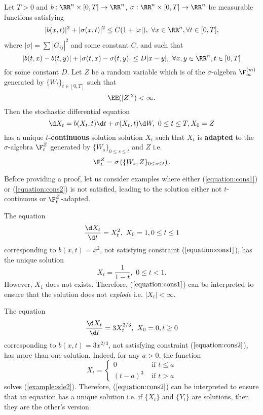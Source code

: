 Let $T>0$ and $b:\RR^n\times[0,T]\to\RR^n$, $\sigma:\RR^n\times[0,T]\to\RR^n$ be measurable functions satisfying
\begin{equation}
    \label{equation:cons1}
    |b(x,t)|^2+|\sigma(x,t)|^2\le C(1+|x|), \,\,\forall x\in\RR^n, \forall t\in[0,T],
\end{equation}
where $|\sigma|=\sum|G_{ij}|^2$ and some constant $C$, and such that
\begin{equation}
    \label{equation:cons2}
    |b(t,x)-b(t,y)|+|\sigma(t,x)-\sigma(t,y)|\le D|x-y|,\,\,\forall x,y\in\RR^n,t\in[0,T]
\end{equation}
for some constant $D$. Let $Z$ be a random variable which is  of the $\sigma$-algebra $\F_\infty^{(m)}$ generated by $\{W_t\}_{t\in[0,T]}$ such that $$\EE(|Z|^2)<\infty.$$
Then the stochastic differential equation
\begin{equation}
    \label{equation:sde:unique}
    \d X_t=b(X_t,t)\d t+\sigma(X_t,t)\d W,\,\, 0\le t\le T, X_0=Z
\end{equation}
has a unique $t$\textbf{-continuous} solution solution $X_t$ such that $X_t$ is \textbf{adapted} to the $\sigma$-algebra $\F_t^Z$ generated by $\{W_s\}_{0\le s\le t}$ and $Z$ i.e.
$$\F_t^Z=\sigma\left(\{W_s,Z\}_{0\le s\le t}\right).$$

Before providing a proof, let us consider examples where either (\ref{equation:cons1}) or (\ref{equation:cons2}) is not satisfied, leading to the solution either not $t$-continuous or $\F_t^Z$-adapted.

\begin{example}
    The equation
    \begin{equation}
        \dfrac{\d X_t}{\d t}=X_t^2,\,\, X_0=1, 0\le t\le 1
    \end{equation}
    corresponding to $b(x,t)=x^2$, not satisfying constraint ($\ref{equation:cons1}$), has the unique solution
    $$X_t=\dfrac{1}{1-t},\,\,0\le t<1.$$
    However, $X_1$ does not exists. Therefore, ($\ref{equation:cons1}$) can be interpreted to ensure that the solution does not \textit{explode} i.e. $|X_t|<\infty$.
\end{example}

\begin{example}
    The equation
    \begin{equation}
        \label{example:sde2}
        \dfrac{\d X_t}{\d t}=3X_t^{2/3},\,\, X_0=0, t\ge0
    \end{equation}
    corresponding to $b(x,t)=3x^{2/3}$, not satisfying constraint ($\ref{equation:cons2}$), has more than one solution. Indeed, for any $a>0$, the function
    $$X_t=\begin{cases}
            0       & \text{ if } t\le a \\
            (t-a)^3 & \text{ if } t>a
        \end{cases}$$
    solves (\ref{example:sde2}). Therefore, ($\ref{equation:cons2}$) can be interpreted to ensure that an equation has a unique solution i.e. if $\{X_t\}$ and $\{Y_t\}$ are solutions, then they are the other's version.
\end{example}


